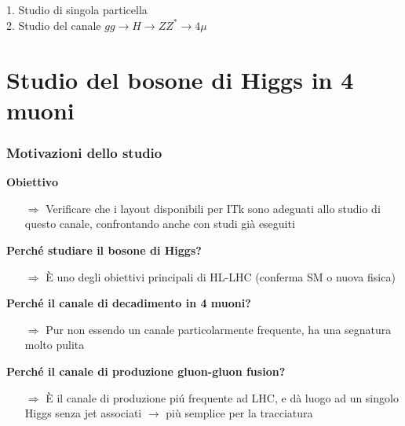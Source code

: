 \documentclass{beamer}
\begin{document}
\section{}
\begin{frame}


\Large{\color{gray}1. Studio di singola particella}\\
\bigskip
\bigskip
\bigskip
\Large{\color{dred}2. Studio del canale $gg\rightarrow H \rightarrow ZZ^{*} \rightarrow 4\mu$}

\end{frame}


\section{Studio del bosone di Higgs in 4 muoni}

\begin{frame}[t]
\frametitle{Motivazioni dello studio}

\textbf{\color{dred}Obiettivo}
\begin{itemize}
\item[\color{black}$\Rightarrow$] Verificare che i layout disponibili per ITk sono adeguati allo studio di questo canale, 
confrontando anche con studi gi\`a eseguiti
\end{itemize}
\bigskip
\textbf{Perch\'e studiare il bosone di Higgs?}
\begin{itemize}
\item[\color{black}$\Rightarrow$] \`E uno degli obiettivi principali di HL-LHC (conferma SM o nuova fisica)
\end{itemize}

\textbf{Perch\'e il canale di decadimento in 4 muoni?}
\begin{itemize}
\item[\color{black}$\Rightarrow$] Pur non essendo un canale particolarmente frequente, ha una segnatura molto pulita
\end{itemize}

\textbf{Perch\'e il canale di produzione gluon-gluon fusion?}
\begin{itemize}
\item[\color{black}$\Rightarrow$] \`E il canale di produzione pi\'u frequente ad LHC, e d\`a luogo ad un singolo
Higgs senza jet associati $\rightarrow$ pi\`u semplice per la tracciatura
\end{itemize}


\end{frame}
\end{document}
